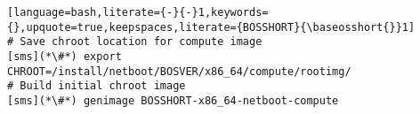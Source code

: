 \begin{lstlisting}[language=bash,literate={-}{-}1,keywords={},upquote=true,keepspaces,literate={BOSSHORT}{\baseosshort{}}1]
# Save chroot location for compute image
[sms](*\#*) export CHROOT=/install/netboot/BOSVER/x86_64/compute/rootimg/
# Build initial chroot image
[sms](*\#*) genimage BOSSHORT-x86_64-netboot-compute
\end{lstlisting}
